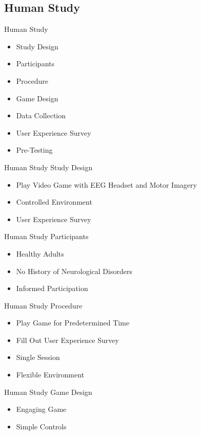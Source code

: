 \subsection*{Human Study}
\begin{frame}{Human Study}
    \begin{itemize}
        \item Study Design
        \item Participants
        \item Procedure
        \item Game Design
        \item Data Collection
        \item User Experience Survey
        \item Pre-Testing
    \end{itemize}
\end{frame}
\begin{frame}{Human Study \textemdash{} Study Design}
    \begin{itemize}
        \item Play Video Game with EEG Headset and Motor Imagery
        \item Controlled Environment
        \item User Experience Survey
    \end{itemize}
\end{frame}
\begin{frame}{Human Study \textemdash{} Participants}
    \begin{itemize}
        \item Healthy Adults
        \item No History of Neurological Disorders
        \item Informed Participation
    \end{itemize}
\end{frame}
\begin{frame}{Human Study \textemdash{} Procedure}
    \begin{itemize}
        \item Play Game for Predetermined Time
        \item Fill Out User Experience Survey
        \item Single Session
        \item Flexible Environment 
    \end{itemize}
\end{frame}
\begin{frame}{Human Study \textemdash{} Game Design}
    \begin{itemize}
        \item Engaging Game
        \item Simple Controls
    \end{itemize}
\end{frame}
